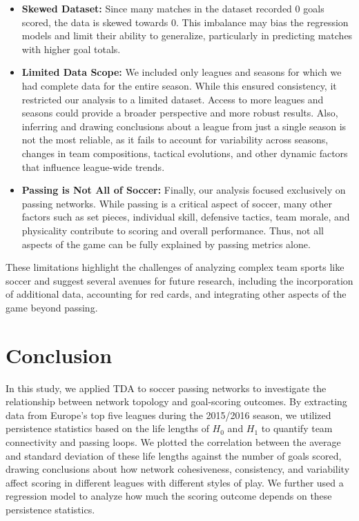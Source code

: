 \documentclass[10pt,twocolumn]{article}
\begin{document}
\begin{itemize}
    \item \textbf{Skewed Dataset:} Since many matches in the dataset recorded $0$ goals scored, the data is skewed towards $0$. This imbalance may bias the regression models and limit their ability to generalize, particularly in predicting matches with higher goal totals.
    
    \item \textbf{Limited Data Scope:} We included only leagues and seasons for which we had complete data for the entire season. While this ensured consistency, it restricted our analysis to a limited dataset. Access to more leagues and seasons could provide a broader perspective and more robust results. Also, inferring and drawing conclusions about a league from just a single season is not the most reliable, as it fails to account for variability across seasons, changes in team compositions, tactical evolutions, and other dynamic factors that influence league-wide trends. 
    
    \item \textbf{Passing is Not All of Soccer:} Finally, our analysis focused exclusively on passing networks. While passing is a critical aspect of soccer, many other factors such as set pieces, individual skill, defensive tactics, team morale, and physicality contribute to scoring and overall performance. Thus, not all aspects of the game can be fully explained by passing metrics alone.
\end{itemize}

These limitations highlight the challenges of analyzing complex team sports like soccer and suggest several avenues for future research, including the incorporation of additional data, accounting for red cards, and integrating other aspects of the game beyond passing.

\section*{Conclusion}

In this study, we applied TDA to soccer passing networks to investigate the relationship between network topology and goal-scoring outcomes. By extracting data from Europe’s top five leagues during the 2015/2016 season, we utilized persistence statistics based on the life lengths of $ H_0 $ and $ H_1 $ to quantify team connectivity and passing loops. We plotted the correlation between the average and standard deviation of these life lengths against the number of goals scored, drawing conclusions about how network cohesiveness, consistency, and variability affect scoring in different leagues with different styles of play. We further used a regression model to analyze how much the scoring outcome depends on these persistence statistics. 
\end{document}
